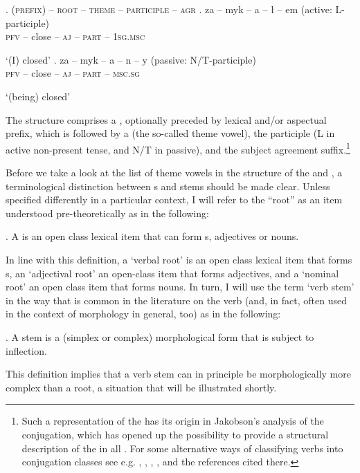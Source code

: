 \ex.\label{zamykac}
\textsc{(prefix) -- root -- theme -- participle -- agr}
\ag.
za -- myk -- a -- \l {} -- em (active: L-participle)\label{1a} \\
\textsc{pfv} -- close -- \textsc{aj} -- \textsc{part} -- \textsc{1sg.msc} \\
\strut `(I) closed' 
\bg. za -- myk -- a -- n -- y \hskip 0.15cm (passive: N/T-participle)\label{1b}\\
\textsc{pfv} -- close -- \textsc{aj} -- \textsc{part} -- \textsc{msc.sg} \\
\strut `(being) closed' 

The  structure comprises a , optionally preceded by lexical and/or aspectual prefix, which is followed by a  (the so-called theme vowel), the participle 
(L in active non-present tense, and N/T in passive), and the subject agreement suffix.\footnote{Such a  representation of the   has its origin in Jakobson's \citeyearpar{Jakobson1948} analysis of the  conjugation, which has opened up the possibility to provide a structural description of the  in all . For some alternative ways of classifying  verbs into conjugation classes see e.g. \cite{Laskowski1975}, \cite{towjand}, \cite{czayk1988}, \cite{Jablonska2007}, and the references cited there.
}%
\par
Before we take a look at the list of theme vowels in the structure of the  and  , a terminological distinction between s and stems should be made clear. Unless specified differently in a particular context, I will refer to the ``root'' as an item understood pre-theoretically as in the following:

\ex. A  is an open class lexical item that can form s, adjectives or nouns.

In line with this definition, a `verbal root' is an open class lexical item that forms s, an `adjectival root' an open-class item that forms adjectives, and a `nominal root' an open class item that forms nouns. 
In turn, I will use the term `verb stem' in the way that is common in the literature on the  verb (and, in fact,  often used in the context of  morphology in general, too) as in the following:

\ex. A  stem is a (simplex or complex) morphological form that is subject to inflection. 

This definition implies that a  verb stem can in principle be morphologically more complex than a root, a situation that will be illustrated shortly. 


